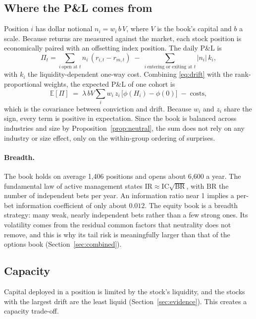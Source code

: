 \documentclass[11pt]{article}
\theoremstyle{definition}
\newcommand{\E}{\mathbb{E}}
\newcommand{\1}{\mathbf{1}}
\begin{document}
\subsection{Where the P\&L comes from}

Position $i$ has dollar notional $n_i=w_i\,b\,V$, where $V$ is the book's capital and $b$ a
scale. Because returns are measured against the market, each stock position is economically
paired with an offsetting index position. The daily P\&L is
\begin{equation}
  \Pi_t=\sum_{i\ \text{open at }t}n_i\,(r_{i,t}-r_{m,t})\;-\;\sum_{i\ \text{entering or exiting at }t}|n_i|\,k_i,
  \label{eq:pnl}
\end{equation}
with $k_i$ the liquidity-dependent one-way cost. Combining \eqref{eq:drift} with the
rank-proportional weights, the expected P\&L of one cohort is
\[
  \E[\Pi]\;=\;\lambda\,bV\sum_i w_i\,z_i\,\big[\phi(H_i)-\phi(0)\big]\;-\;\text{costs},
\]
which is the covariance between conviction and drift. Because $w_i$ and $z_i$ share the
sign, every term is positive in expectation. Since the book is balanced across industries
and size by Proposition~\ref{prop:neutral}, the sum does not rely on any industry or size
effect, only on the within-group ordering of surprises.

\paragraph{Breadth.} The book holds on average 1{,}406 positions and opens about 6{,}600
a year. The fundamental law of active management \citep{Grinold1989} states
$\mathrm{IR}\approx\mathrm{IC}\sqrt{\mathrm{BR}}$, with $\mathrm{BR}$ the number of independent
bets per year. An information ratio near 1 implies a per-bet information coefficient of only
about $0.012$. The equity book is a breadth strategy: many weak, nearly independent bets
rather than a few strong ones. Its volatility comes from the residual common factors that
neutrality does not remove, and this is why its tail risk is meaningfully larger than that of
the options book (Section~\ref{sec:combined}).

\subsection{Capacity}

Capital deployed in a position is limited by the stock's liquidity, and the stocks with
the largest drift are the least liquid (Section~\ref{sec:evidence}). This creates a
capacity trade-off.
\end{document}
